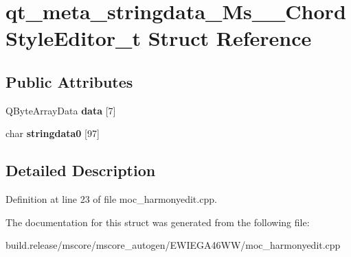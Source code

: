 \hypertarget{structqt__meta__stringdata___ms_____chord_style_editor__t}{}\section{qt\+\_\+meta\+\_\+stringdata\+\_\+\+Ms\+\_\+\+\_\+\+Chord\+Style\+Editor\+\_\+t Struct Reference}
\label{structqt__meta__stringdata___ms_____chord_style_editor__t}
\subsection*{Public Attributes}
\begin{DoxyCompactItemize}
\item 
\mbox{\label{structqt__meta__stringdata___ms_____chord_style_editor__t_aab960a7ac696b34b40aa7d31cd040f22}} 
Q\+Byte\+Array\+Data {\bfseries data} \mbox{[}7\mbox{]}
\item 
\mbox{\label{structqt__meta__stringdata___ms_____chord_style_editor__t_a0094abf50101866d0e520b1bcd3ef0f1}} 
char {\bfseries stringdata0} \mbox{[}97\mbox{]}
\end{DoxyCompactItemize}


\subsection{Detailed Description}


Definition at line 23 of file moc\+\_\+harmonyedit.\+cpp.



The documentation for this struct was generated from the following file\+:\begin{DoxyCompactItemize}
\item 
build.\+release/mscore/mscore\+\_\+autogen/\+E\+W\+I\+E\+G\+A46\+W\+W/moc\+\_\+harmonyedit.\+cpp\end{DoxyCompactItemize}
